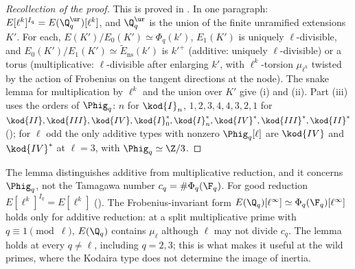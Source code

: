 \begin{proof}[Recollection of the proof]
This is proved in . In one paragraph: $E[\ell^k]^{I_q}=E(\Q_q^{\ur})[\ell^k]$, and $\Q_q^{\ur}$ is the union of the finite unramified
extensions $K'$. For each, $E(K')/E_0(K')\simeq\Phi_q(k')$, $E_1(K')$ is uniquely $\ell$-divisible, and $E_0(K')/E_1(K')\simeq\tilde E_{\mathrm{ns}}(k')$ is $k'^+$
(additive: uniquely $\ell$-divisible) or a torus (multiplicative: $\ell$-divisible after enlarging $k'$, with $\ell^k$-torsion $\mu_{\ell^k}$ twisted by the
action of Frobenius on the tangent directions at the node). The snake lemma for multiplication by $\ell^k$ and the union over $K'$ give (i)
and (ii). Part (iii) uses the orders of $\Phig_q$: $n$ for $\kod{I}_n$, $1,2,3,4,4,3,2,1$ for $\kod{II},\kod{III},\kod{IV},\kod{I}_0^*,\kod{I}_n^*,\kod{IV}^*,
\kod{III}^*,\kod{II}^*$ (); for $\ell$ odd the only additive types with nonzero $\Phig_q[\ell]$ are $\kod{IV}$ and $\kod{IV}^*$ at $\ell=3$, with
$\Phig_q\simeq\Z/3$.
\end{proof}

\begin{warning}\label{warn:galrep:component-invariants}
The lemma distinguishes additive from multiplicative reduction, and it concerns $\Phig_q$, not the Tamagawa number $c_q=\#\Phi_q(\F_q)$. For
good reduction $E[\ell^k]^{I_q}=E[\ell^k]$ (). The Frobenius-invariant form $E(\Q_q)[\ell^\infty]\simeq\Phi_q(\F_q)[\ell^\infty]$ holds only for
additive reduction: at a split multiplicative prime with $q\equiv1\pmod\ell$, $E(\Q_q)$ contains $\mu_\ell$ although $\ell$ may not divide $c_q$. The lemma
holds at every $q\ne\ell$, including $q=2,3$; this is what makes it useful at the wild primes, where the Kodaira type does not determine
the image of inertia.
\end{warning}

